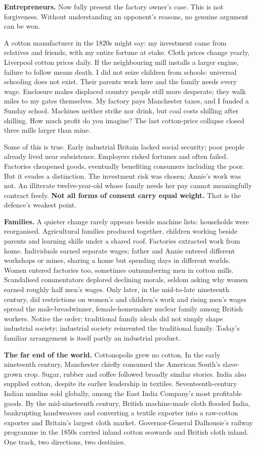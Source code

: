 \textbf{Entrepreneurs.} Now fully present the factory owner's case. This is not forgiveness. Without understanding an opponent's reasons, no genuine argument can be won.

A cotton manufacturer in the 1820s might say: my investment came from relatives and friends, with my entire fortune at stake. Cloth prices change yearly, Liverpool cotton prices daily. If the neighbouring mill installs a larger engine, failure to follow means death. I did not seize children from schools: universal schooling does not exist. Their parents work here and the family needs every wage. Enclosure makes displaced country people still more desperate; they walk miles to my gates themselves. My factory pays Manchester taxes, and I funded a Sunday school. Machines neither strike nor drink, but coal costs shilling after shilling. How much profit do you imagine? The last cotton-price collapse closed three mills larger than mine.

Some of this is true. Early industrial Britain lacked social security; poor people already lived near subsistence. Employers risked fortunes and often failed. Factories cheapened goods, eventually benefiting consumers including the poor. But it evades a distinction. The investment risk was chosen; Annie's work was not. An illiterate twelve-year-old whose family needs her pay cannot meaningfully contract freely. \textbf{Not all forms of consent carry equal weight.} That is the defence's weakest point.

\textbf{Families.} A quieter change rarely appears beside machine lists: households were reorganised. Agricultural families produced together, children working beside parents and learning skills under a shared roof. Factories extracted work from home. Individuals earned separate wages; father and Annie entered different workshops or mines, sharing a home but spending days in different worlds. Women entered factories too, sometimes outnumbering men in cotton mills. Scandalised commentators deplored declining morals, seldom asking why women earned roughly half men's wages. Only later, in the mid-to-late nineteenth century, did restrictions on women's and children's work and rising men's wages spread the male-breadwinner, female-homemaker nuclear family among British workers. Notice the order: traditional family ideals did not simply shape industrial society; industrial society reinvented the traditional family. Today's familiar arrangement is itself partly an industrial product.

\textbf{The far end of the world.} Cottonopolis grew no cotton. In the early nineteenth century, Manchester chiefly consumed the American South's slave-grown crop. Sugar, rubber and coffee followed broadly similar stories. India also supplied cotton, despite its earlier leadership in textiles. Seventeenth-century Indian muslins sold globally, among the East India Company's most profitable goods. By the mid-nineteenth century, British machine-made cloth flooded India, bankrupting handweavers and converting a textile exporter into a raw-cotton exporter and Britain's largest cloth market. Governor-General Dalhousie's railway programme in the 1850s carried inland cotton seawards and British cloth inland. One track, two directions, two destinies.

